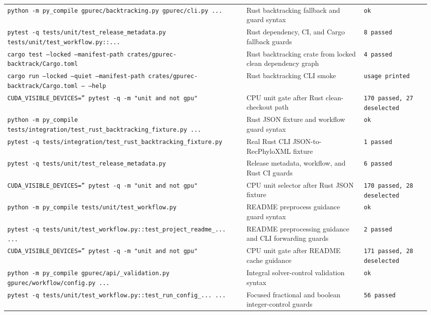 \documentclass[11pt]{article}
\begin{document}
\begin{center}
\begin{tabular}{lll}
\texttt{python -m py\_compile gpurec/backtracking.py gpurec/cli.py ...} &
Rust backtracking fallback and guard syntax &
\texttt{ok} \\
\texttt{pytest -q tests/unit/test\_release\_metadata.py tests/unit/test\_workflow.py::...} &
Rust dependency, CI, and Cargo fallback guards &
\texttt{8 passed} \\
\texttt{cargo test --locked --manifest-path crates/gpurec-backtrack/Cargo.toml} &
Rust backtracking crate from locked clean dependency graph &
\texttt{4 passed} \\
\texttt{cargo run --locked --quiet --manifest-path crates/gpurec-backtrack/Cargo.toml -- --help} &
Rust backtracking CLI smoke &
\texttt{usage printed} \\
\texttt{CUDA\_VISIBLE\_DEVICES='' pytest -q -m "unit and not gpu"} &
CPU unit gate after Rust clean-checkout path &
\texttt{170 passed, 27 deselected} \\
\texttt{python -m py\_compile tests/integration/test\_rust\_backtracking\_fixture.py ...} &
Rust JSON fixture and workflow guard syntax &
\texttt{ok} \\
\texttt{pytest -q tests/integration/test\_rust\_backtracking\_fixture.py} &
Real Rust CLI JSON-to-RecPhyloXML fixture &
\texttt{1 passed} \\
\texttt{pytest -q tests/unit/test\_release\_metadata.py} &
Release metadata, workflow, and Rust CI guards &
\texttt{6 passed} \\
\texttt{CUDA\_VISIBLE\_DEVICES='' pytest -q -m "unit and not gpu"} &
CPU unit selector after Rust JSON fixture &
\texttt{170 passed, 28 deselected} \\
\texttt{python -m py\_compile tests/unit/test\_workflow.py} &
README preprocess guidance guard syntax &
\texttt{ok} \\
\texttt{pytest -q tests/unit/test\_workflow.py::test\_project\_readme\_... ...} &
README preprocessing guidance and CLI forwarding guards &
\texttt{2 passed} \\
\texttt{CUDA\_VISIBLE\_DEVICES='' pytest -q -m "unit and not gpu"} &
CPU unit gate after README cache guidance &
\texttt{171 passed, 28 deselected} \\
\texttt{python -m py\_compile gpurec/api/\_validation.py gpurec/workflow/config.py ...} &
Integral solver-control validation syntax &
\texttt{ok} \\
\texttt{pytest -q tests/unit/test\_workflow.py::test\_run\_config\_... ...} &
Focused fractional and boolean integer-control guards &
\texttt{56 passed} \\

\end{tabular}
\end{center}
\end{document}
